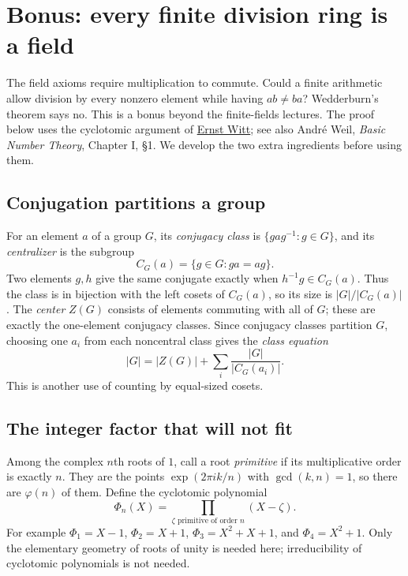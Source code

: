 \section{Bonus: every finite division ring is a field}
\label{sec:wedderburn}

The field axioms require multiplication to commute. Could a finite
arithmetic allow division by every nonzero element while having $ab\ne ba$?
Wedderburn's theorem says no. This is a bonus beyond the finite-fields
lectures. The proof below uses the cyclotomic argument of
\href{https://nonagon.org/ExLibris/sites/default/files/pdf/Uber-Kommutativitat-endlicher-Schiefkorper-Ernst-Witt.pdf}{Ernst Witt};
see also Andr\'e Weil, \emph{Basic Number Theory}, Chapter I, \S1.
We develop the two extra ingredients before using them.

\subsection*{Conjugation partitions a group}

For an element $a$ of a group $G$, its \emph{conjugacy class} is
$\{gag^{-1}:g\in G\}$, and its \emph{centralizer} is the subgroup
\[
C_G(a)=\{g\in G:ga=ag\}.
\]
Two elements $g,h$ give the same conjugate exactly when
$h^{-1}g\in C_G(a)$. Thus the class is in bijection with the left
cosets of $C_G(a)$, so its size is $|G|/|C_G(a)|$.
The \emph{center} $Z(G)$ consists of elements commuting with all of $G$;
these are exactly the one-element conjugacy classes. Since conjugacy
classes partition $G$, choosing one $a_i$ from each noncentral class gives
the \emph{class equation}
\[
|G|=|Z(G)|+\sum_i\frac{|G|}{|C_G(a_i)|}.
\]
This is another use of counting by equal-sized cosets.

\subsection*{The integer factor that will not fit}

Among the complex $n$th roots of $1$, call a root \emph{primitive} if
its multiplicative order is exactly $n$. They are the points
$\exp(2\pi i k/n)$ with $\gcd(k,n)=1$, so there are $\varphi(n)$ of them.
Define the cyclotomic polynomial
\[
\Phi_n(X)=\prod_{\zeta\text{ primitive of order }n}(X-\zeta).
\]
For example $\Phi_1=X-1$, $\Phi_2=X+1$,
$\Phi_3=X^2+X+1$, and $\Phi_4=X^2+1$.
Only the elementary geometry of roots of unity is needed here;
irreducibility of cyclotomic polynomials is not needed.

